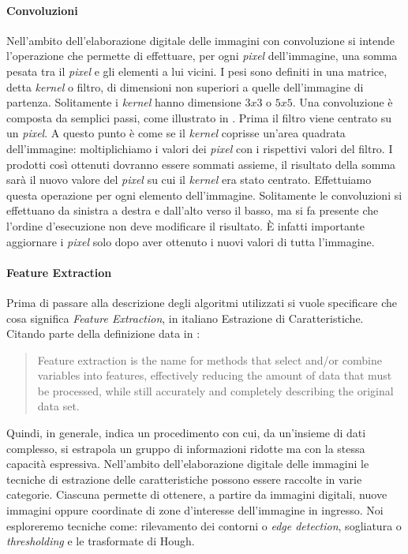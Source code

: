 \paragraph{Convoluzioni}
Nell'ambito dell'elaborazione digitale delle immagini con convoluzione si intende l'operazione che permette di effettuare, per ogni \textit{pixel} dell'immagine, una somma pesata tra il \textit{pixel} e gli elementi a lui vicini.
I pesi sono definiti in una matrice, detta \textit{kernel} o filtro, di dimensioni non superiori a quelle dell'immagine di partenza.
Solitamente i \textit{kernel} hanno dimensione $3x3$ o $5x5$.%
Una convoluzione è composta da semplici passi, come illustrato in \cite{kernel-conv}.
Prima il filtro viene centrato su un \textit{pixel}.
A questo punto è come se il \textit{kernel} coprisse un'area quadrata dell'immagine: moltiplichiamo i valori dei \textit{pixel} con i rispettivi valori del filtro.
I prodotti così ottenuti dovranno essere sommati assieme, il risultato della somma sarà il nuovo valore del \textit{pixel} su cui il \textit{kernel} era stato centrato.
Effettuiamo questa operazione per ogni elemento dell'immagine.
Solitamente le convoluzioni si effettuano da sinistra a destra e dall'alto verso il basso, ma si fa presente che l'ordine d'esecuzione non deve modificare il risultato.
È infatti importante aggiornare i \textit{pixel} solo dopo aver ottenuto i nuovi valori di tutta l'immagine.

\paragraph{Feature Extraction}
Prima di passare alla descrizione degli algoritmi utilizzati si vuole specificare che cosa significa \textit{Feature Extraction}, in italiano Estrazione di Caratteristiche.
Citando parte della definizione data in \cite{deepai-feat-ext} :
\begin{quote}
Feature extraction is the name for methods that select and/or combine variables into features, effectively reducing the amount of data that must be processed, while still accurately and completely describing the original data set.
\end{quote}
Quindi, in generale, indica un procedimento con cui, da un'insieme di dati complesso, si estrapola un gruppo di informazioni ridotte ma con la stessa capacità espressiva.
Nell'ambito dell'elaborazione digitale delle immagini le tecniche di estrazione delle caratteristiche possono essere raccolte in varie categorie.
Ciascuna permette di ottenere, a partire da immagini digitali, nuove immagini oppure coordinate di zone d'interesse dell'immagine in ingresso.
Noi esploreremo tecniche come: rilevamento dei contorni o \textit{edge detection}, sogliatura o \textit{thresholding} e le trasformate di Hough.

